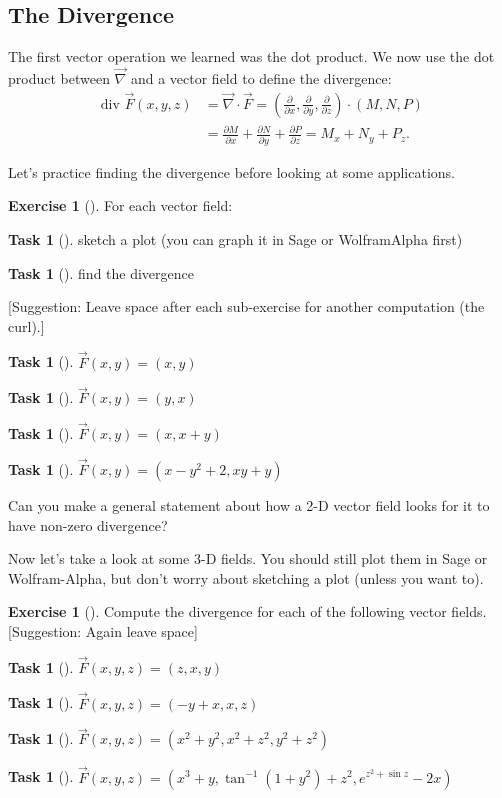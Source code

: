 \documentclass[10pt,]{book}
\theoremstyle{plain}
\theoremstyle{definition}
\theoremstyle{definition}
\theoremstyle{definition}
\theoremstyle{definition}
\newtheorem{exploration}[project]{Exercise}
\newtheorem{task}[project]{Task}
\theoremstyle{definition}
\numberwithin{equation}{section}
\newcommand{\amp}{&}
\begin{document}
\subsection[{The Divergence}]{The Divergence}\label{subsection-36}
The first vector operation we learned was the dot product. We now use the dot product between \(\vec \nabla\) and a vector field to define the divergence:%
\begin{align*}
\text{ div } \vec F(x,y,z) 
\amp = \vec \nabla\cdot \vec F 
= \left(\frac{\partial }{\partial x},\frac{\partial }{\partial y},\frac{\partial }{\partial z} \right)\cdot (M,N,P)\\
\amp = \frac{\partial M}{\partial x}+\frac{\partial N}{\partial y}+\frac{\partial P}{\partial z} 
= M_x+N_y+P_z 
.
\end{align*}
%
\par
Let's practice finding the divergence before looking at some applications.%
\begin{exploration}[]\label{x2d_div}
For each vector field:%
\begin{task}[]\label{task-776}
sketch a plot (you can graph it in Sage or WolframAlpha first)  %
\end{task}
\begin{task}[]\label{task-777}
find the divergence%
\end{task}
[Suggestion: Leave space after each sub-exercise for another computation (the curl).]%
\begin{task}[]\label{task-778}
\(\vec{F}(x,y)=(x,y)\)%
\end{task}
\begin{task}[]\label{task-779}
\(\vec{F}(x,y)=(y,x)\)%
\end{task}
\begin{task}[]\label{task-780}
\(\vec{F}(x,y)=(x,x+y)\)%
\end{task}
\begin{task}[]\label{task-781}
\(\vec{F}(x,y)=(x-y^2+2, xy+y)\)%
\end{task}
Can you make a general statement about how a 2-D vector field looks for it to have non-zero divergence?%
\end{exploration}
Now let's take a look at some 3-D fields. You should still plot them in Sage or Wolfram-Alpha, but don't worry about sketching a plot (unless you want to).%
\begin{exploration}[]\label{x3d_div}
Compute the divergence for each of the following vector fields. [Suggestion: Again leave space]%
\begin{task}[]\label{task-782}
\(\vec F(x,y,z) = \left(z,x,y \right)\)%
\end{task}
\begin{task}[]\label{task-783}
\(\vec F(x,y,z) = \left(-y+x,x,z \right)\)%
\end{task}
\begin{task}[]\label{task-784}
\(\vec F(x,y,z) = \left(x^2+y^2,x^2+z^2,y^2+z^2 \right)\)%
\end{task}
\begin{task}[]\label{task-785}
\(\vec F(x,y,z) = \left(x^3+y,\tan^{-1}(1+y^2) + z^2,e^{z^2+\sin z} -2x\right)\)%
\end{task}
\end{exploration}
\end{document}

